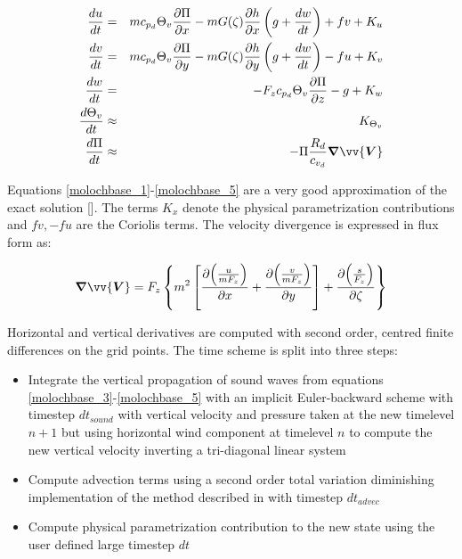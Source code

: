 \begin{eqnarray}
  \label{molochbase_1}
  \frac{du}{dt} &=& m c_{p_d}\Theta_v \frac{\partial \Pi}{\partial x}
                 -  m G(\zeta) \frac{\partial h}{\partial x}
                 \left(g + \frac{dw}{dt}\right) + fv + K_u \\
  \label{molochbase_2}
  \frac{dv}{dt} &=& m c_{p_d}\Theta_v \frac{\partial \Pi}{\partial y}
                 - m G(\zeta) \frac{\partial h}{\partial y}
                 \left(g + \frac{dw}{dt}\right) - fu + K_v \\
  \label{molochbase_3}
  \frac{dw}{dt} &=& - F_z c_{p_d}\Theta_v \frac{\partial \Pi}{\partial z}
                 - g + K_w \\
  \label{molochbase_4}
  \frac{d\Theta_{v}}{dt} &\approx& K_{\Theta_v} \\
  \label{molochbase_5}
  \frac{d\Pi}{dt} &\approx& -\Pi \frac{R_d}{c_{v_d}} \bm{\nabla} \vv{\bm{V}}
\end{eqnarray}

Equations \ref{molochbase_1}-\ref{molochbase_5} are a very good approximation
of the exact solution [\cite{Emanuel_94}]. The terms $K_x$ denote the physical
parametrization contributions and $fv,-fu$ are the Coriolis terms. The
velocity divergence is expressed in flux form as:

\begin{equation}
  \label{total_divergence}
  \bm{\nabla} \vv{\bm{V}} = F_z \left\{ m^2 \left[
    \frac{\partial{ \left(\frac{u}{m F_z} \right)}}{\partial x} +
    \frac{\partial{ \left(\frac{v}{m F_z} \right)}}{\partial y} \right] +
  \frac{\partial{ \left(\frac{s}{F_z} \right)}}{\partial \zeta} \right\}
\end{equation}

Horizontal and vertical derivatives are computed with second order, centred
finite differences on the grid points. The time scheme is split into three
steps:

\begin{itemize}
  \item Integrate the vertical propagation of sound waves from
    equations \ref{molochbase_3}-\ref{molochbase_5} with an implicit
    Euler-backward scheme with timestep $dt_{sound}$ with vertical
    velocity and pressure taken at the new timelevel $n+1$ but using
    horizontal wind component at timelevel $n$ to compute the new vertical
    velocity inverting a tri-diagonal linear system
  \item Compute advection terms using a second order total variation 
    diminishing implementation of the \cite{Godunov_59} method
    described in \cite{hubbard2003three} with timestep $dt_{advec}$
  \item Compute physical parametrization contribution to the new state
    using the user defined large timestep $dt$
\end{itemize}

